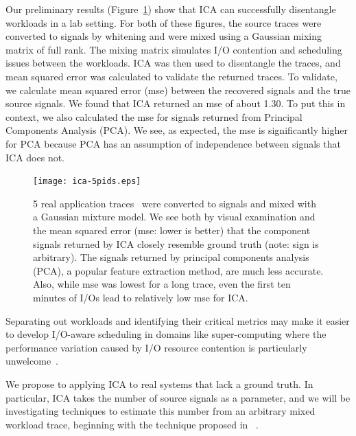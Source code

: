 Our preliminary results (Figure~\ref{fig:ica}) show that ICA
can successfully disentangle workloads in a lab setting.  For both of these
figures, the source traces were converted to signals by whitening and were mixed using
a Gaussian mixing matrix of full rank.
The mixing matrix simulates I/O
contention and scheduling issues between the workloads.  
ICA was then used to disentangle the
traces, and mean squared error was calculated to validate the returned traces.  
To validate, we calculate mean squared error (mse) between the recovered signals and
the true source signals.  We found that ICA returned an mse of about 1.30.  To
put this in context, we also calculated the mse for signals returned from
Principal Components Analysis (PCA).  We see, as expected, the mse is
significantly higher for PCA because PCA has an assumption of independence
between signals that ICA does not. 

\begin{figure}
  \centering
  \texttt{[image: ica-5pids.eps]}
  \caption{5 real application traces~\cite{fiu} were converted to signals and mixed with a
  Gaussian mixture model.  We see both by visual examination and the mean
  squared error (mse: lower is better) that the component signals returned by ICA closely resemble ground truth (note: sign is arbitrary).  The signals
  returned by principal components analysis (PCA), a popular feature extraction
  method, are much less accurate.  Also, while mse was lowest for a long
  trace, even the first ten minutes of I/Os lead to relatively low mse for ICA.}
  \label{fig:ica}
\end{figure}

Separating out workloads and identifying their critical metrics may make it
easier to develop I/O-aware scheduling in domains like super-computing where the
performance variation caused by I/O
resource contention is particularly unwelcome~\cite{liufast14}.

We propose to applying ICA to real systems that lack a
ground truth. 
In particular, ICA takes the number of source signals as a
parameter, and we will be investigating techniques to estimate this number from
an arbitrary mixed workload trace, beginning with the technique proposed in
~\cite{Sparse component analysis and blind source separation of underdetermined
mixtures
}. %

